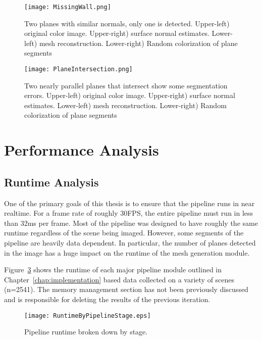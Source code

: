 \begin{figure}[!htpb]
    \centering
    \texttt{[image: MissingWall.png]}
    \caption{Two planes with similar normals, only one is detected. Upper-left) original color image. Upper-right) surface normal estimates. Lower-left) mesh reconstruction. Lower-right) Random colorization of plane segments}
    \label{fig:missingwall}
\end{figure}



\begin{figure}[!htpb]
    \centering
    \texttt{[image: PlaneIntersection.png]}
    \caption{Two nearly parallel planes that intersect show some segmentation errors. Upper-left) original color image. Upper-right) surface normal estimates. Lower-left) mesh reconstruction. Lower-right) Random colorization of plane segments}
    \label{fig:planeintersect}
\end{figure}



\section{Performance Analysis}
\subsection{Runtime Analysis}
One of the primary goals of this thesis is to ensure that the pipeline runs in near realtime. For a frame rate of roughly 30FPS, the entire pipeline must run in less than 32ms per frame. Most of the pipeline was designed to  have roughly the same runtime regardless of the scene being imaged. However, some segments of the pipeline are heavily data dependent. In particular, the number of planes detected in the image has a huge impact on the runtime of the mesh generation module.\par 

Figure~\ref{fig:runtimebystage} shows the runtime of each major pipeline module outlined in Chapter~\ref{chap:implementation} based data collected on a variety of scenes (n=2541). The memory management section has not been previously discussed and is responsible for deleting the results of the previous iteration. 

\begin{figure}[!htpb]
    \centering
    \texttt{[image: RuntimeByPipelineStage.eps]}
    \caption{Pipeline runtime broken down by stage.}
    \label{fig:runtimebystage}
\end{figure}

